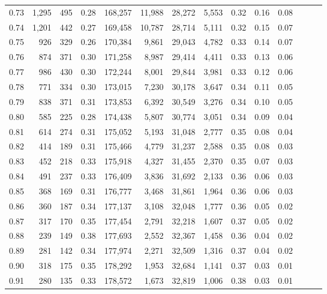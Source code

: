 \begin{tabular}{rrrrrrrrrrrrrr}
0.73 &  1,295 &  495 &  0.28 &  168,257 &   11,988 &  28,272 &   5,553 &  0.32 &  0.16 &      0.08 \\
0.74 &  1,201 &  442 &  0.27 &  169,458 &   10,787 &  28,714 &   5,111 &  0.32 &  0.15 &      0.07 \\
0.75 &    926 &  329 &  0.26 &  170,384 &    9,861 &  29,043 &   4,782 &  0.33 &  0.14 &      0.07 \\
0.76 &    874 &  371 &  0.30 &  171,258 &    8,987 &  29,414 &   4,411 &  0.33 &  0.13 &      0.06 \\
0.77 &    986 &  430 &  0.30 &  172,244 &    8,001 &  29,844 &   3,981 &  0.33 &  0.12 &      0.06 \\
0.78 &    771 &  334 &  0.30 &  173,015 &    7,230 &  30,178 &   3,647 &  0.34 &  0.11 &      0.05 \\
0.79 &    838 &  371 &  0.31 &  173,853 &    6,392 &  30,549 &   3,276 &  0.34 &  0.10 &      0.05 \\
0.80 &    585 &  225 &  0.28 &  174,438 &    5,807 &  30,774 &   3,051 &  0.34 &  0.09 &      0.04 \\
0.81 &    614 &  274 &  0.31 &  175,052 &    5,193 &  31,048 &   2,777 &  0.35 &  0.08 &      0.04 \\
0.82 &    414 &  189 &  0.31 &  175,466 &    4,779 &  31,237 &   2,588 &  0.35 &  0.08 &      0.03 \\
0.83 &    452 &  218 &  0.33 &  175,918 &    4,327 &  31,455 &   2,370 &  0.35 &  0.07 &      0.03 \\
0.84 &    491 &  237 &  0.33 &  176,409 &    3,836 &  31,692 &   2,133 &  0.36 &  0.06 &      0.03 \\
0.85 &    368 &  169 &  0.31 &  176,777 &    3,468 &  31,861 &   1,964 &  0.36 &  0.06 &      0.03 \\
0.86 &    360 &  187 &  0.34 &  177,137 &    3,108 &  32,048 &   1,777 &  0.36 &  0.05 &      0.02 \\
0.87 &    317 &  170 &  0.35 &  177,454 &    2,791 &  32,218 &   1,607 &  0.37 &  0.05 &      0.02 \\
0.88 &    239 &  149 &  0.38 &  177,693 &    2,552 &  32,367 &   1,458 &  0.36 &  0.04 &      0.02 \\
0.89 &    281 &  142 &  0.34 &  177,974 &    2,271 &  32,509 &   1,316 &  0.37 &  0.04 &      0.02 \\
0.90 &    318 &  175 &  0.35 &  178,292 &    1,953 &  32,684 &   1,141 &  0.37 &  0.03 &      0.01 \\
0.91 &    280 &  135 &  0.33 &  178,572 &    1,673 &  32,819 &   1,006 &  0.38 &  0.03 &      0.01 \\

\end{tabular}
